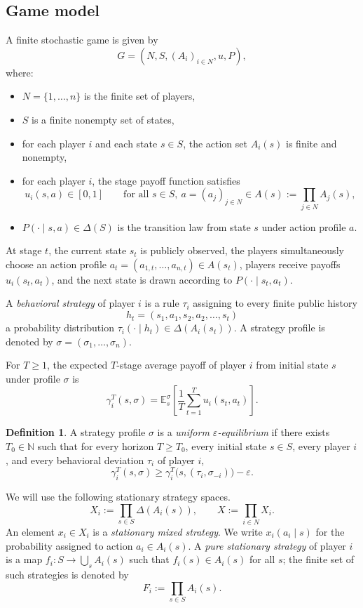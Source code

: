 \documentclass[11pt]{article}
\theoremstyle{definition}
\newtheorem{definition}[theorem]{Definition}
\newcommand{\E}{\mathbb{E}}
\newcommand{\1}{\mathbf{1}}
\begin{document}
\subsection{Game model}

A finite stochastic game is given by
\[
G=(N,S,(A_i)_{i\in N},u,P),
\]
where:
\begin{itemize}[leftmargin=2.3em]
\item $N=\{1,\dots,n\}$ is the finite set of players,
\item $S$ is a finite nonempty set of states,
\item for each player $i$ and each state $s\in S$, the action set $A_i(s)$ is finite and nonempty,
\item for each player $i$, the stage payoff function satisfies
\[
 u_i(s,a)\in[0,1]\qquad\text{for all }s\in S,\ a=(a_j)_{j\in N}\in A(s):=\prod_{j\in N}A_j(s),
\]
\item $P(\cdot\mid s,a)\in\Delta(S)$ is the transition law from state $s$ under action profile $a$.
\end{itemize}

At stage $t$, the current state $s_t$ is publicly observed, the players simultaneously choose an action profile $a_t=(a_{1,t},\dots,a_{n,t})\in A(s_t)$, players receive payoffs $u_i(s_t,a_t)$, and the next state is drawn according to $P(\cdot\mid s_t,a_t)$.

A \emph{behavioral strategy} of player $i$ is a rule $\tau_i$ assigning to every finite public history
\[
h_t=(s_1,a_1,s_2,a_2,\dots,s_t)
\]
a probability distribution $\tau_i(\cdot\mid h_t)\in\Delta(A_i(s_t))$. A strategy profile is denoted by $\sigma=(\sigma_1,\dots,\sigma_n)$.

For $T\ge1$, the expected $T$-stage average payoff of player $i$ from initial state $s$ under profile $\sigma$ is
\[
\gamma_i^T(s,\sigma)
=\E_s^{\sigma}\!\left[\frac1T\sum_{t=1}^{T}u_i(s_t,a_t)\right].
\]

\begin{definition}
A strategy profile $\sigma$ is a \emph{uniform $\varepsilon$-equilibrium} if there exists $T_0\in\mathbb N$ such that for every horizon $T\ge T_0$, every initial state $s\in S$, every player $i$, and every behavioral deviation $\tau_i$ of player $i$,
\[
\gamma_i^T(s,\sigma)\ge\gamma_i^T\bigl(s,(\tau_i,\sigma_{-i})\bigr)-\varepsilon.
\]
\end{definition}

We will use the following stationary strategy spaces.
\[
X_i:=\prod_{s\in S}\Delta(A_i(s)),\qquad X:=\prod_{i\in N}X_i.
\]
An element $x_i\in X_i$ is a \emph{stationary mixed strategy}. We write $x_i(a_i\mid s)$ for the probability assigned to action $a_i\in A_i(s)$. A \emph{pure stationary strategy} of player $i$ is a map $f_i:S\to\bigcup_{s}A_i(s)$ such that $f_i(s)\in A_i(s)$ for all $s$; the finite set of such strategies is denoted by
\[
F_i:=\prod_{s\in S}A_i(s).
\]
\end{document}
